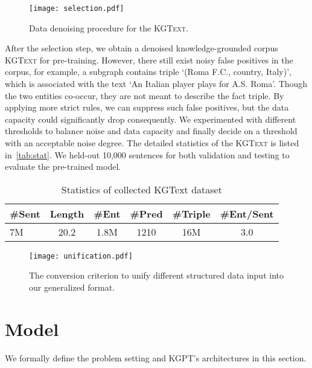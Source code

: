 \documentclass[11pt,a4paper]{article}
\newcommand{\dataset}{\textsc{KGText}\xspace}
\newcommand{\model}{KGPT\xspace}
\begin{document}
\begin{figure}[!htb]
    \centering
    \texttt{[image: selection.pdf]}
    \caption{Data denoising procedure for the \dataset.}
    \label{fig:data-selection}
    \vspace{-1ex}
\end{figure}
After the selection step, we obtain a denoised knowledge-grounded corpus \dataset for pre-training. However, there still exist noisy false positives in the corpus, for example, a subgraph contains triple `(Roma F.C., country,  Italy)', which is associated with the text `An Italian player plays for A.S. Roma'. Though the two entities co-occur, they are not meant to describe the fact triple. By applying more strict rules, we can suppress such false positives, but the data capacity could significantly drop consequently. We experimented with different thresholds to balance noise and data capacity and finally decide on a threshold with an acceptable noise degree. The detailed statistics of the \dataset is listed in~\autoref{tab:stat}. We held-out 10,000 sentences for both validation and testing to evaluate the pre-trained model.
\begin{table}[!thb]
\centering
\small
\begin{tabular}{lccccc}
\hline
\#Sent & Length & \#Ent & \#Pred & \#Triple & \#Ent/Sent \\
\hline
7M  & 20.2 & 1.8M & 1210 & 16M & 3.0 \\
\hline
\end{tabular}
\caption{Statistics of collected KGText dataset}
\label{tab:stat}
\vspace{-2ex}
\end{table}

\begin{figure*}[!thb]
    \centering
    \texttt{[image: unification.pdf]}
    \caption{The conversion criterion to unify different structured data input into our generalized format. }
    \label{fig:unification}
    \vspace{-2ex}
\end{figure*}

\section{Model}
We formally define the problem setting and \model's architectures in this section.
\end{document}
